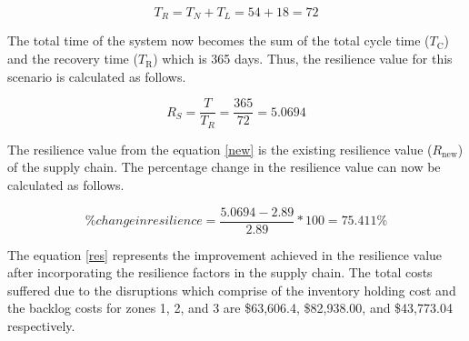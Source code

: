 \begin{equation}
    T_R = T_N + T_L = 54 + 18 = 72  \label{3.3}
\end{equation}

 The total time of the system now becomes the sum of the total cycle time ($T_{\text{C}}$) and the recovery time ($T_{\text{R}}$) which is 365 days. Thus, the resilience value for this scenario is calculated as follows.

\begin{equation}
  R_S = \frac{T}{T_R} = \frac{365}{72} = 5.0694  \label{new}
\end{equation}

The resilience value from the equation \ref{new} is the existing resilience value ($R_{\text{new}}$) of the supply chain. The percentage change in the resilience value can now be calculated as follows.

\begin{equation}
      \% change in resilience = \frac{5.0694 - 2.89}{2.89} * 100 = 75.411 \%  \label{res}
\end{equation}

The equation \ref{res} represents the improvement achieved in the resilience value after incorporating the resilience factors in the supply chain. The total costs suffered due to the disruptions which comprise of the inventory holding cost and the backlog costs for zones 1, 2, and 3 are \$63,606.4, \$82,938.00, and \$43,773.04 respectively. 

